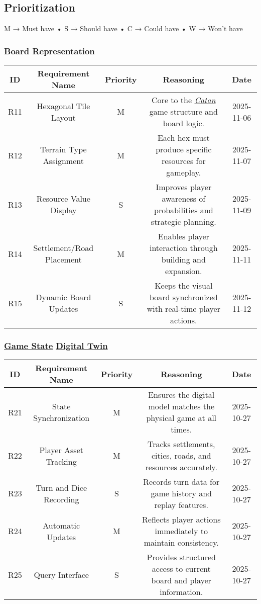 \documentclass{article}
\newcommand{\Catan}{\href{https://en.wikipedia.org/wiki/Catan}{Catan}}
\newcommand{\DigitalTwin}{\href{https://en.wikipedia.org/wiki/Digital_twin}{Digital Twin}}
\newcommand{\GameState}{\href{https://milvus.io/ai-quick-reference/what-is-a-state-in-rl}{Game State}}
\begin{document}
\subsection{Prioritization}\label{subsec:prioritization}
M → Must have
• S → Should have
• C → Could have
• W → Won't have 

\subsubsection*{Board Representation}

\begin{tabular}{|c|c|c|c|c|}
\hline
\textbf{ID} & \textbf{Requirement Name} & \textbf{Priority} &
\textbf{Reasoning} & \textbf{Date} \\
\hline
R11 & Hexagonal Tile Layout & M &
\parbox[t]{4cm}{Core to the \emph{\Catan{}} game structure and board logic.} &
2025-11-06 \\
\hline
R12 & Terrain Type Assignment & M &
\parbox[t]{4cm}{Each hex must produce specific resources for gameplay.} &
2025-11-07 \\
\hline
R13 & Resource Value Display & S &
\parbox[t]{4cm}{Improves player awareness of probabilities and
strategic planning.} &
2025-11-09 \\
\hline
R14 & Settlement/Road Placement & M &
\parbox[t]{4cm}{Enables player interaction through building and
expansion.} &
2025-11-11 \\
\hline
R15 & Dynamic Board Updates & S &
\parbox[t]{4cm}{Keeps the visual board synchronized with real-time
player actions.} &
2025-11-12 \\
\hline
\end{tabular}

\vspace{1em}

\subsubsection*{\GameState{} \DigitalTwin{}}

\begin{tabular}{|c|c|c|c|c|}
\hline
\textbf{ID} & \textbf{Requirement Name} & \textbf{Priority} &
\textbf{Reasoning} & \textbf{Date} \\
\hline
R21 & State Synchronization & M &
\parbox[t]{4cm}{Ensures the digital model matches the physical game
at all times.} &
2025-10-27 \\
\hline
R22 & Player Asset Tracking & M &
\parbox[t]{4cm}{Tracks settlements, cities, roads, and resources
accurately.} &
2025-10-27 \\
\hline
R23 & Turn and Dice Recording & S &
\parbox[t]{4cm}{Records turn data for game history and replay
features.} &
2025-10-27 \\
\hline
R24 & Automatic Updates & M &
\parbox[t]{4cm}{Reflects player actions immediately to maintain
consistency.} &
2025-10-27 \\
\hline
R25 & Query Interface & S &
\parbox[t]{4cm}{Provides structured access to current board and
player information.} &
2025-10-27 \\
\hline
\end{tabular}
\end{document}
